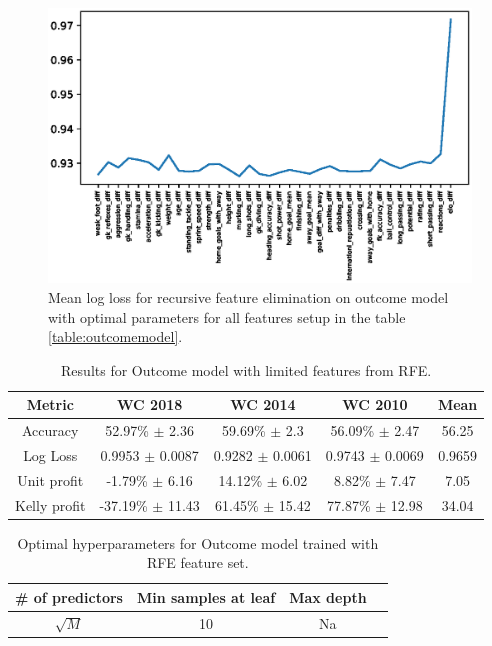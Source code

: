 \begin{figure}[H]
    \centering
    \includegraphics[width=1\textwidth]{img/optimal_avg_lloss.eps}
    \caption{Mean log loss for recursive feature elimination on outcome model with optimal parameters for all features setup in the table \ref{table:outcomemodel}.}
    \label{fig:optimal_avg_loss}
\end{figure}

\begin{table}
    \caption{Results for Outcome model with limited features from RFE.}
    \begin{tabular}{| c | c| c| c|c|}
        \hline
        Metric& \textbf{WC 2018} & \textbf{WC 2014} & \textbf{WC 2010} & Mean\\
        \hline
        Accuracy  & 52.97\% $\pm$ 2.36 & 59.69\% $\pm$ 2.3 & 56.09\% $\pm$ 2.47& 56.25 \\
        Log Loss & 0.9953 $\pm$ 0.0087 & 0.9282 $\pm$ 0.0061 & 0.9743 $\pm$ 0.0069& 0.9659 \\
        Unit profit  & -1.79\% $\pm$ 6.16 & 14.12\% $\pm$ 6.02 & 8.82\% $\pm$ 7.47& 7.05 \\
        Kelly profit  & -37.19\% $\pm$ 11.43 & 61.45\% $\pm$ 15.42 & 77.87\% $\pm$ 12.98& 34.04 \\
 \hline
    \end{tabular}
    \label{table:outcomemodel_rfe}
\end{table}

\begin{table}
    \caption{Optimal hyperparameters for Outcome model trained with RFE feature set.}
    \begin{tabular}{| c | c| c| c|}
        \hline
         \# of predictors & Min samples at leaf & Max depth\\
        \hline
         $\sqrt{M}$ & 10 & Na \\
        \hline
    \end{tabular}
    \label{table:hyperparam_results_rfe}
\end{table}


